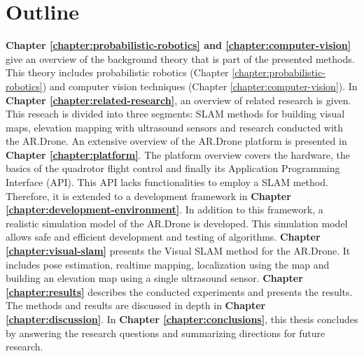 	\section{Outline}
\textbf{Chapter \ref{chapter:probabilistic-robotics} and \ref{chapter:computer-vision}} give an overview of the background theory that is part of the presented methods.
This theory includes probabilistic robotics (Chapter \ref{chapter:probabilistic-robotics}) and computer vision techniques (Chapter \ref{chapter:computer-vision}).
In \textbf{Chapter \ref{chapter:related-research}}, an overview of related research is given.
This reseach is divided into three segments: SLAM methods for building visual maps, elevation mapping with ultrasound sensors and research conducted with the AR.Drone.
An extensive overview of the AR.Drone platform is presented in \textbf{Chapter \ref{chapter:platform}}.
The platform overview covers the hardware, the basics of the quadrotor flight control and finally its Application Programming Interface (API).
This API lacks functionalities to employ a SLAM method.
Therefore, it is extended to a development framework in \textbf{Chapter \ref{chapter:development-environment}}.
In addition to this framework, a realistic simulation model of the AR.Drone is developed.
This simulation model allows safe and efficient development and testing of algorithms.
\textbf{Chapter \ref{chapter:visual-slam}} presents the Visual SLAM method for the AR.Drone.
It includes pose estimation, realtime  mapping, localization using the map and building an elevation map using a single ultrasound sensor.
\textbf{Chapter \ref{chapter:results}} describes the conducted experiments and presents the results.
The methods and results are discussed in depth in \textbf{Chapter \ref{chapter:discussion}}.
In \textbf{Chapter \ref{chapter:conclusions}}, this thesis concludes by answering the research questions and summarizing directions for future research.